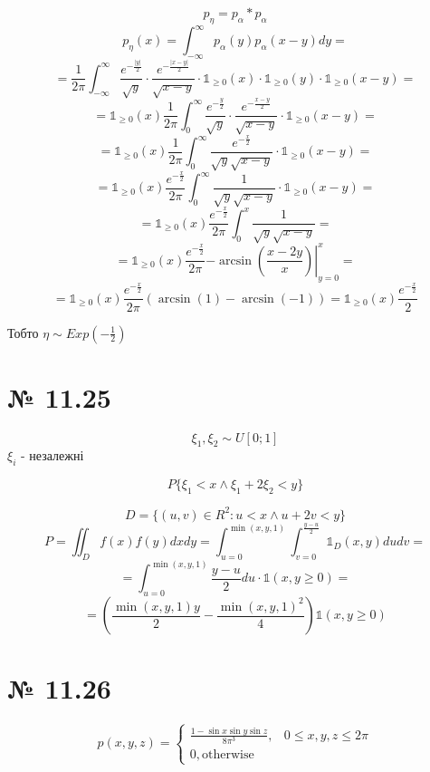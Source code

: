 \documentclass[11pt, a4paper]{article} %
\begin{document}
$$p_\eta = p_\alpha \ast p_\alpha$$
$$p_\eta(x) = \int_{-\infty}^\infty p_\alpha(y)p_\alpha(x-y) dy = $$
$$= \frac{1}{2\pi} \int_{-\infty}^\infty \frac{e^{-\frac{|y|}{2}}}{\sqrt{y}} \cdot \frac{e^{-\frac{|x-y|}{2}}}{\sqrt{x-y}} \cdot \mathbb{1}_{\ge 0}(x) \cdot \mathbb{1}_{\ge 0}(y) \cdot \mathbb{1}_{\ge 0}(x-y) = $$
$$=\mathbb{1}_{\ge 0}(x) \frac{1}{2\pi} \int_{0}^\infty \frac{e^{-\frac{y}{2}}}{\sqrt{y}} \cdot \frac{e^{-\frac{x-y}{2}}}{\sqrt{x-y}} \cdot \mathbb{1}_{\ge 0}(x-y) = $$
$$=\mathbb{1}_{\ge 0}(x) \frac{1}{2\pi} \int_{0}^\infty \frac{e^{-\frac{x}{2}}}{\sqrt{y}\sqrt{x-y}} \cdot \mathbb{1}_{\ge 0}(x-y) = $$
$$=\mathbb{1}_{\ge 0}(x) \frac{e^{-\frac{x}{2}}}{2\pi} \int_{0}^\infty \frac{1}{\sqrt{y}\sqrt{x-y}} \cdot \mathbb{1}_{\ge 0}(x-y) = $$
$$=\mathbb{1}_{\ge 0}(x) \frac{e^{-\frac{x}{2}}}{2\pi} \int_{0}^x \frac{1}{\sqrt{y}\sqrt{x-y}} = $$
$$=\mathbb{1}_{\ge 0}(x) \frac{e^{-\frac{x}{2}}}{2\pi} \left.-\arcsin(\frac{x-2y}{x})\right|_{y=0}^x = $$
$$=\mathbb{1}_{\ge 0}(x) \frac{e^{-\frac{x}{2}}}{2\pi} (\arcsin(1) - \arcsin(-1)) = \mathbb{1}_{\ge 0}(x) \frac{e^{-\frac{x}{2}}}{2}$$

Тобто $\eta \sim Exp(-\frac{1}{2})$

\section*{№ 11.25}
\begin{mdframed}
    $$\xi_1, \xi_2 \sim U[0;1]$$
    $\xi_i$ - незалежні

    $$P\{\xi_1 < x \wedge \xi_1 + 2\xi_2 < y\}$$
\end{mdframed}

$$D = \{(u,v) \in R^2 : u < x \wedge u + 2v < y\}$$
$$P = \iint_D f(x)f(y) dxdy = \int_{u=0}^{\min(x,y,1)} \int_{v=0}^{\frac{y-u}{2}} \mathbb{1}_D(x,y) du dv= $$
$$= \int_{u=0}^{\min(x,y,1)} \frac{y-u}{2} du \cdot \mathbb{1}(x,y \ge 0) = $$
$$=\boxed{\left(\frac{\min(x,y,1)y}{2} - \frac{\min(x,y,1)^2}{4}\right) \mathbb{1}(x,y \ge 0)}$$

\section*{№ 11.26}
\begin{mdframed}
    $$p(x,y,z)=\begin{cases}
        \frac{1-\sin x\sin y\sin z}{8\pi^3}, & 0\le x,y,z \le 2\pi\\
        0, \text{otherwise}
    \end{cases}$$
\end{mdframed}
\end{document}
